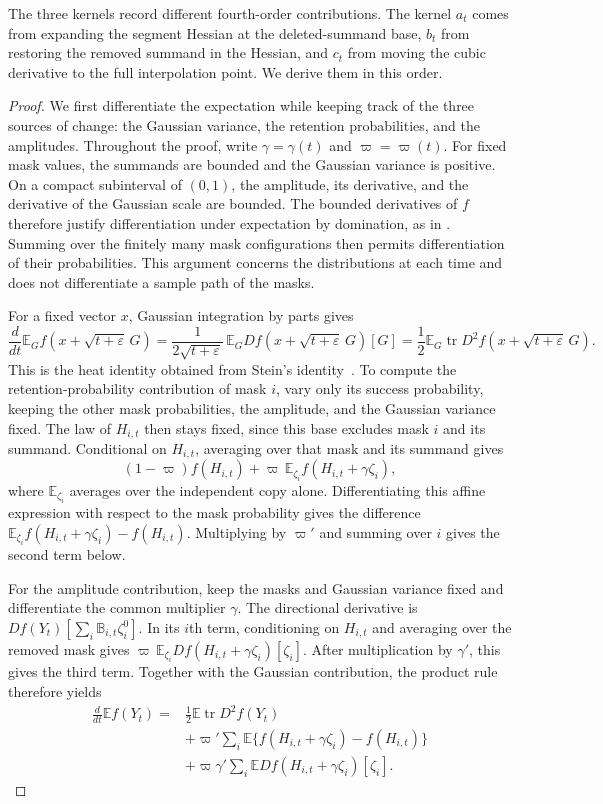 \documentclass[11pt,letterpaper]{article}
\theoremstyle{remark}
\newcommand{\E}{\mathbb E}
\newcommand{\tr}{\operatorname{tr}}
\begin{document}
The three kernels record different fourth-order contributions.
The kernel $a_t$ comes from expanding the segment Hessian at the
deleted-summand base, $b_t$ from restoring the removed summand in
the Hessian, and $c_t$ from moving the cubic derivative to the full
interpolation point. We derive them in this order.

\begin{proof}
We first differentiate the expectation while keeping track of the
three sources of change: the Gaussian variance, the retention
probabilities, and the amplitudes. Throughout the proof, write
\(\gamma=\gamma(t)\) and \(\varpi=\varpi(t)\).
For fixed mask values, the summands are bounded and the Gaussian
variance is positive. On a compact subinterval of \((0,1)\), the
amplitude, its derivative, and the derivative of the Gaussian scale
are bounded. The bounded derivatives of \(f\) therefore justify
differentiation under expectation by domination, as in
\cite[Section~2.3]{Folland1999}. Summing over the finitely many
mask configurations then permits differentiation of their
probabilities. This argument concerns the distributions at each
time and does not differentiate a sample path of the masks.

For a fixed vector \(x\), Gaussian integration by parts gives
\[
 \frac{d}{dt}\E_G f(x+\sqrt{t+\varepsilon}\,G)
 =\frac{1}{2\sqrt{t+\varepsilon}}\,
       \E_G Df(x+\sqrt{t+\varepsilon}\,G)[G]
 =\frac12\E_G\tr D^2f(x+\sqrt{t+\varepsilon}\,G).
\]
This is the heat identity obtained from
Stein's identity~\cite{Stein1981}.
To compute the retention-probability contribution of mask $i$,
vary only its success probability, keeping the other mask
probabilities, the amplitude, and the Gaussian variance fixed.
The law of $H_{i,t}$ then stays fixed, since this base excludes
mask $i$ and its summand. Conditional on $H_{i,t}$, averaging
over that mask and its summand gives
\[
 (1-\varpi)f(H_{i,t})
       +\varpi\,\E_{\zeta_i}f(H_{i,t}+\gamma\zeta_i),
\]
where \(\E_{\zeta_i}\) averages over the independent copy alone.
Differentiating this affine expression with respect to the mask
probability gives the difference
$\E_{\zeta_i}f(H_{i,t}+\gamma\zeta_i)-f(H_{i,t})$.
Multiplying by $\varpi'$ and summing over $i$ gives the second
term below.

For the amplitude contribution, keep the masks and Gaussian
variance fixed and differentiate the common multiplier $\gamma$.
The directional derivative is
$Df(Y_t)[\sum_i\mathbb B_{i,t}\zeta_i^0]$.
In its $i$th term, conditioning on $H_{i,t}$ and averaging over
the removed mask gives
$\varpi\,\E_{\zeta_i}Df(H_{i,t}+\gamma\zeta_i)[\zeta_i]$.
After multiplication by $\gamma'$, this gives the third term.
Together with the Gaussian contribution, the product rule
therefore yields
\begin{equation}
 \begin{aligned}
 \frac{d}{dt}\E f(Y_t)
 ={}&\frac12\E\tr D^2f(Y_t)\\
 &+\varpi'\sum_i\E\{f(H_{i,t}+\gamma\zeta_i)-f(H_{i,t})\}\\
 &+\varpi\gamma'\sum_i
       \E Df(H_{i,t}+\gamma\zeta_i)[\zeta_i].
 \end{aligned}
 \label{appx-an:three-contributions}
\end{equation}


\end{proof}
\end{document}
